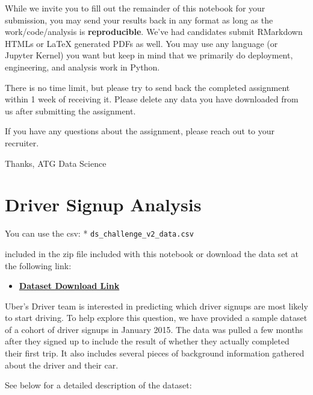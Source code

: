 \documentclass[11pt]{article}
\providecommand{\tightlist}{%
      \setlength{\itemsep}{0pt}\setlength{\parskip}{0pt}}
\begin{document}
While we invite you to fill out the remainder of this notebook for your
submission, you may send your results back in any format as long as the
work/code/analysis is \textbf{reproducible}. We've had candidates submit
RMarkdown HTMLs or LaTeX generated PDFs as well. You may use any
language (or Jupyter Kernel) you want but keep in mind that we primarily
do deployment, engineering, and analysis work in Python.

There is no time limit, but please try to send back the completed
assignment within 1 week of receiving it. Please delete any data you
have downloaded from us after submitting the assignment.

If you have any questions about the assignment, please reach out to your
recruiter.

Thanks, ATG Data Science

    \section{Driver Signup Analysis}\label{driver-signup-analysis}

You can use the csv: * \texttt{ds\_challenge\_v2\_data.csv}

included in the zip file included with this notebook or download the
data set at the following link:

\begin{itemize}
\tightlist
\item
  \href{https://drive.google.com/a/uber.com/file/d/0BxkZqrCogcyWbUs2Smhlc0VSams/view?usp=drive_web}{\textbf{Dataset
  Download Link}}
\end{itemize}

Uber's Driver team is interested in predicting which driver signups are
most likely to start driving. To help explore this question, we have
provided a sample dataset of a cohort of driver signups in January 2015.
The data was pulled a few months after they signed up to include the
result of whether they actually completed their first trip. It also
includes several pieces of background information gathered about the
driver and their car.

See below for a detailed description of the dataset:
\end{document}
